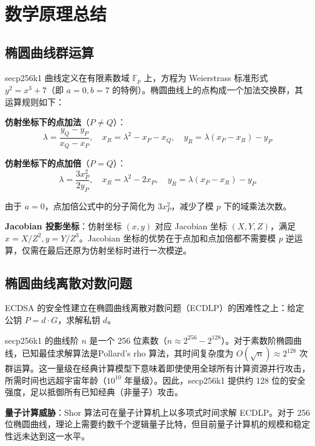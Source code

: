 \documentclass[a4paper,12pt]{ctexart}
\begin{document}
\section{数学原理总结}
\subsection{椭圆曲线群运算}

secp256k1 曲线定义在有限素数域 $\mathbb{F}_p$ 上，方程为 Weierstrass 标准形式 $y^2 = x^3 + 7$（即 $a=0, b=7$ 的特例）。椭圆曲线上的点构成一个加法交换群，其运算规则如下：

\textbf{仿射坐标下的点加法}（$P \neq Q$）：
\begin{equation}
\lambda = \frac{y_Q - y_P}{x_Q - x_P}, \quad x_R = \lambda^2 - x_P - x_Q, \quad y_R = \lambda(x_P - x_R) - y_P
\end{equation}

\textbf{仿射坐标下的点加倍}（$P = Q$）：
\begin{equation}
\lambda = \frac{3x_P^2}{2y_P}, \quad x_R = \lambda^2 - 2x_P, \quad y_R = \lambda(x_P - x_R) - y_P
\end{equation}

由于 $a=0$，点加倍公式中的分子简化为 $3x_P^2$，减少了模 $p$ 下的域乘法次数。

\textbf{Jacobian 投影坐标}：仿射坐标 $(x, y)$ 对应 Jacobian 坐标 $(X, Y, Z)$，满足 $x = X/Z^2, y = Y/Z^3$。Jacobian 坐标的优势在于点加和点加倍都不需要模 $p$ 逆运算，仅需在最后还原为仿射坐标时进行一次模逆。

\subsection{椭圆曲线离散对数问题}

ECDSA 的安全性建立在椭圆曲线离散对数问题（ECDLP）的困难性之上：给定公钥 $P = d \cdot G$，求解私钥 $d$。

secp256k1 的曲线阶 $n$ 是一个 256 位素数（$n \approx 2^{256} - 2^{128}$）。对于素数阶椭圆曲线，已知最佳求解算法是Pollard's rho 算法，其时间复杂度为 $O(\sqrt{n}) \approx 2^{128}$ 次群运算。这一量级在经典计算模型下意味着即使使用全球所有计算资源并行攻击，所需时间也远超宇宙年龄（$10^{10}$ 年量级）。因此，secp256k1 提供约 128 位的安全强度，足以抵御所有已知经典（非量子）攻击。

\textbf{量子计算威胁}：Shor 算法可在量子计算机上以多项式时间求解 ECDLP。对于 256 位椭圆曲线，理论上需要约数千个逻辑量子比特，但目前量子计算机的规模和稳定性远未达到这一水平。
\end{document}
